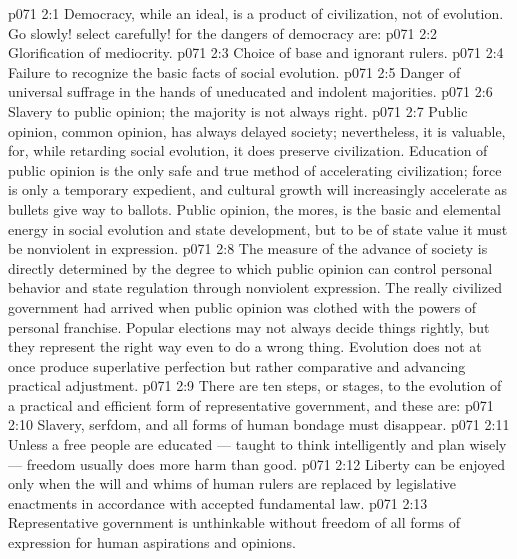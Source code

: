 \vs p071 2:1 Democracy, while an ideal, is a product of civilization, not of evolution. Go slowly! select carefully! for the dangers of democracy are:
\vs p071 2:2 \bibnobreakspace Glorification of mediocrity.
\vs p071 2:3 \bibnobreakspace Choice of base and ignorant rulers.
\vs p071 2:4 \bibnobreakspace Failure to recognize the basic facts of social evolution.
\vs p071 2:5 \bibnobreakspace Danger of universal suffrage in the hands of uneducated and indolent majorities.
\vs p071 2:6 \bibnobreakspace Slavery to public opinion; the majority is not always right.
\vs p071 2:7 \pc Public opinion, common opinion, has always delayed society; nevertheless, it is valuable, for, while retarding social evolution, it does preserve civilization. Education of public opinion is the only safe and true method of accelerating civilization; force is only a temporary expedient, and cultural growth will increasingly accelerate as bullets give way to ballots. Public opinion, the mores, is the basic and elemental energy in social evolution and state development, but to be of state value it must be nonviolent in expression.
\vs p071 2:8 The measure of the advance of society is directly determined by the degree to which public opinion can control personal behavior and state regulation through nonviolent expression. The really civilized government had arrived when public opinion was clothed with the powers of personal franchise. Popular elections may not always decide things rightly, but they represent the right way even to do a wrong thing. Evolution does not at once produce superlative perfection but rather comparative and advancing practical adjustment.
\vs p071 2:9 \pc There are ten steps, or stages, to the evolution of a practical and efficient form of representative government, and these are:
\vs p071 2:10 \bibnobreakspace {} Slavery, serfdom, and all forms of human bondage must disappear.
\vs p071 2:11 \pc {}\bibnobreakspace {} Unless a free people are educated --- taught to think intelligently and plan wisely --- freedom usually does more harm than good.
\vs p071 2:12 \pc {}\bibnobreakspace {} Liberty can be enjoyed only when the will and whims of human rulers are replaced by legislative enactments in accordance with accepted fundamental law.
\vs p071 2:13 \pc {}\bibnobreakspace {} Representative government is unthinkable without freedom of all forms of expression for human aspirations and opinions.
